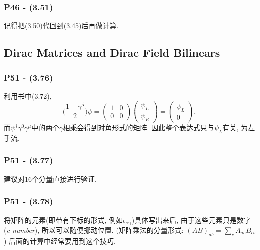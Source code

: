 \documentclass[cn,hazy,blue,11pt,device=normal,chinesefont=founder]{elegantnote}
\begin{document}
\subsubsection{P46 - (3.51)}

记得把(3.50)代回到(3.45)后再做计算. 

\subsection{Dirac Matrices and Dirac Field Bilinears}

\subsubsection{P51 - (3.76)}

利用书中(3.72), 
\begin{equation}
  \biggl( \frac{1 - \gamma^5}{2} \biggr) \psi = \left( \begin{array}{cc} 1 & 0 \\ 0 & 0 \end{array} \right) \left( \begin{array}{c} \psi_L \\ \psi_R \end{array} \right) = \left( \begin{array}{c} \psi_L \\ 0 \end{array} \right), 
\end{equation}
而$\psi^\dagger \gamma^0 \gamma^\mu$中的两个$\gamma$相乘会得到对角形式的矩阵. 因此整个表达式只与$\psi_L$有关, 为左手流. 

\subsubsection{P51 - (3.77)}

建议对16个分量直接进行验证. 

\subsubsection{P51 - (3.78)}

将矩阵的元素(即带有下标的形式, 例如$\epsilon_{\alpha \gamma}$)具体写出来后, 由于这些元素只是数字(\textit{c-number}), 所以可以随便挪动位置. (矩阵乘法的分量形式: $(AB)_{ab} = \sum_c A_{ac} B_{cb}$) 后面的计算中经常要用到这个技巧. 
\end{document}
